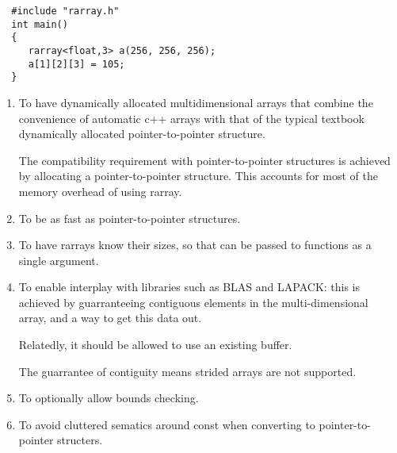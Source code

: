 \documentclass[11pt,twoside]{article}
\begin{document}
\begin{framed}\vspace{-14pt}%
\begin{verbatim}
  #include "rarray.h"
  int main() 
  {
     rarray<float,3> a(256, 256, 256);
     a[1][2][3] = 105;
  }
\end{verbatim}%
\vspace{-14pt}%
\end{framed}


\begin{enumerate}\itemsep1pt\parskip3pt
 
\item To have dynamically allocated multidimensional arrays that
combine the convenience of automatic c++ arrays with that of the
typical textbook dynamically allocated pointer-to-pointer
structure. 

The compatibility requirement with pointer-to-pointer structures
is achieved by allocating a pointer-to-pointer structure. This
accounts for most of the memory overhead of using rarray.

\item To be as fast as pointer-to-pointer structures.

\item To have rarrays know their sizes, so that can be passed to
functions as a single argument. 

\item To enable interplay with libraries such as BLAS and LAPACK: this
  is achieved by guarranteeing contiguous elements in the
  multi-dimensional array, and a way to get this data out.

Relatedly, it should be allowed to use an existing buffer.
    
The guarrantee of contiguity means strided arrays are not supported.

\item To optionally allow bounds checking.

\item To avoid cluttered sematics around const when converting to  pointer-to-pointer structers.
\end{enumerate}
\end{document}
